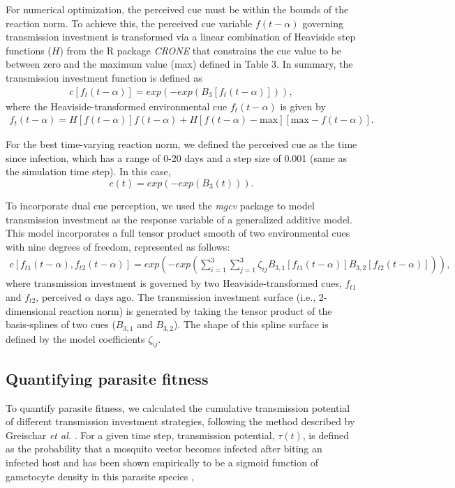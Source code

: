 \documentclass[10pt,letterpaper]{article}
\begin{document}
For numerical optimization, the perceived cue must be within the bounds of the reaction norm. To achieve this, the perceived cue variable $f(t-\alpha)$ governing transmission investment is transformed via a linear combination of Heaviside step functions ($H$) from the R package \emph{CRONE} \cite{smith_effective_2017} that constrains the cue value to be between zero and the maximum value (max) defined in Table 3. In summary, the transmission investment function is defined as
\begin{eqnarray}
\label{eq:scheme7}
    c[f_{t}(t-\alpha)]=exp(-exp(B_{3}[f_{t}(t-\alpha)])),
\end{eqnarray}
where the Heaviside-transformed environmental cue $f_{t}(t-\alpha)$ is given by
\begin{eqnarray}
\label{eq:scheme8}
    f_{t}(t-\alpha)=H[f(t-\alpha)]f(t-\alpha)+H[f(t-\alpha)-\text{max}][\text{max}-f(t-\alpha)].
\end{eqnarray}

For the best time-varying reaction norm, we defined the perceived cue as the time since infection, which has a range of 0-20 days and a step size of 0.001 (same as the simulation time step). In this case, 
\begin{equation}
c(t)=exp(-exp(B_{3}(t))).
\end{equation}

To incorporate dual cue perception, we used the \emph{mgcv} package \cite{wood_mgcv_2001} to model transmission investment as the response variable of a generalized additive model. This model incorporates a full tensor product smooth of two environmental cues with nine degrees of freedom, represented as follows:
\begin{eqnarray}
\label{eq::dual_cue}
    c[f_{t1}(t-\alpha),f_{t2}(t-\alpha)]=exp(-exp(\sum_{i=1}^{3}\sum_{j=1}^{3}\zeta_{ij}B_{3,1}[f_{t1}(t-\alpha)]B_{3,2}[f_{t2}(t-\alpha)])),
\end{eqnarray}
where transmission investment is governed by two Heaviside-transformed cues, $f_{t1}$ and $f_{t2}$, perceived $\alpha$ days ago. The transmission investment surface (i.e., 2-dimensional reaction norm) is generated by taking the tensor product of the basis-splines of two cues ($B_{3,1}$ and $B_{3,2}$). The shape of this spline surface is defined by the model coefficients $\zeta_{ij}$.\newline

\subsection*{Quantifying parasite fitness}
To quantify parasite fitness, we calculated the cumulative transmission potential of different transmission investment strategies, following the method described by Greischar \emph{et al.} \cite{greischar_predicting_2016}. For a given time step, transmission potential, $\tau(t)$, is defined as the probability that a mosquito vector becomes infected after biting an infected host and has been shown empirically to be a sigmoid function of gametocyte density in this parasite species \cite{huijben_chemotherapy_2010},
\end{document}
